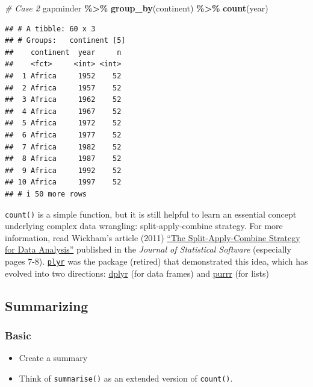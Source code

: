 \documentclass[
]{book}
\newenvironment{Shaded}{\begin{snugshade}}{\end{snugshade}}
\newcommand{\CommentTok}[1]{\textcolor[rgb]{0.56,0.35,0.01}{\textit{#1}}}
\newcommand{\FunctionTok}[1]{\textcolor[rgb]{0.13,0.29,0.53}{\textbf{#1}}}
\newcommand{\NormalTok}[1]{#1}
\newcommand{\SpecialCharTok}[1]{\textcolor[rgb]{0.81,0.36,0.00}{\textbf{#1}}}
\providecommand{\tightlist}{%
  \setlength{\itemsep}{0pt}\setlength{\parskip}{0pt}}
\begin{document}
\begin{Shaded}
\begin{Highlighting}[]
\CommentTok{\# Case 2}
\NormalTok{gapminder }\SpecialCharTok{\%\textgreater{}\%}
  \FunctionTok{group\_by}\NormalTok{(continent) }\SpecialCharTok{\%\textgreater{}\%}
  \FunctionTok{count}\NormalTok{(year)}
\end{Highlighting}
\end{Shaded}

\begin{verbatim}
## # A tibble: 60 x 3
## # Groups:   continent [5]
##    continent  year     n
##    <fct>     <int> <int>
##  1 Africa     1952    52
##  2 Africa     1957    52
##  3 Africa     1962    52
##  4 Africa     1967    52
##  5 Africa     1972    52
##  6 Africa     1977    52
##  7 Africa     1982    52
##  8 Africa     1987    52
##  9 Africa     1992    52
## 10 Africa     1997    52
## # i 50 more rows
\end{verbatim}

\texttt{count()} is a simple function, but it is still helpful to learn an essential concept underlying complex data wrangling: split-apply-combine strategy. For more information, read Wickham's article (2011) \href{http://citeseerx.ist.psu.edu/viewdoc/download?doi=10.1.1.182.5667&rep=rep1&type=pdf}{``The Split-Apply-Combine Strategy for Data Analysis''} published in the \emph{Journal of Statistical Software} (especially pages 7-8). \href{https://github.com/hadley/plyr}{\texttt{plyr}} was the package (retired) that demonstrated this idea, which has evolved into two directions: \href{https://dplyr.tidyverse.org/}{dplyr} (for data frames) and \href{https://purrr.tidyverse.org/}{purrr} (for lists)

\subsection{Summarizing}\label{summarizing}

\subsubsection{Basic}\label{basic}

\begin{itemize}
\tightlist
\item
  Create a summary
\item
  Think of \texttt{summarise()} as an extended version of \texttt{count()}.
\end{itemize}
\end{document}
